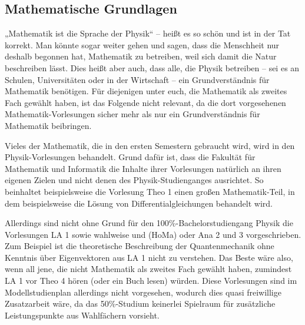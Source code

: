 \subsection{Mathematische Grundlagen}
\label{mathegrundlagen}
„Mathematik ist die Sprache der Physik“ -- heißt es so schön und ist in der Tat korrekt. Man könnte sogar weiter gehen und sagen, dass die Menschheit nur deshalb begonnen hat, Mathematik zu betreiben, weil sich damit die Natur beschreiben lässt. Dies heißt aber auch, dass alle, die Physik betreiben -- sei es an Schulen, Universitäten oder in der Wirtschaft -- ein Grundverständnis für Mathematik benötigen. Für diejenigen unter euch, die Mathematik als zweites Fach gewählt haben, ist das Folgende nicht relevant, da die dort vorgesehenen Mathematik-Vorlesungen sicher mehr als nur ein Grundverständnis für Mathematik beibringen.

Vieles der Mathematik, die in den ersten Semestern gebraucht wird, wird in den Physik-Vorlesungen behandelt. Grund dafür ist, dass die Fakultät für Mathematik und Informatik die Inhalte ihrer Vorlesungen natürlich an ihren eigenen Zielen und nicht denen des Physik-Studienganges ausrichtet. So beinhaltet beispielsweise die Vorlesung \gls{Theo} 1 einen großen Mathematik-Teil, in dem beispielsweise die Lösung von Differentialgleichungen behandelt wird.

Allerdings sind nicht ohne Grund für den 100\%-Bachelorstudiengang Physik die Vorlesungen \gls{LA} 1 sowie wahlweise  und  (\gls{HoMa}) oder \gls{Ana} 2 und 3 vorgeschrieben. Zum Beispiel ist die theoretische Beschreibung der Quantenmechanik ohne Kenntnis über Eigenvektoren aus \gls{LA} 1 nicht zu verstehen. Das Beste wäre also, wenn all jene, die nicht Mathematik als zweites Fach gewählt haben, zumindest \gls{LA} 1 vor \gls{Theo} 4 hören (oder ein Buch lesen) würden. Diese Vorlesungen sind im Modellstudienplan allerdings nicht vorgesehen, wodurch dies quasi freiwillige Zusatzarbeit wäre, da das 50\%-Studium keinerlei Spielraum für zusätzliche Leistungspunkte aus Wahlfächern vorsieht.
